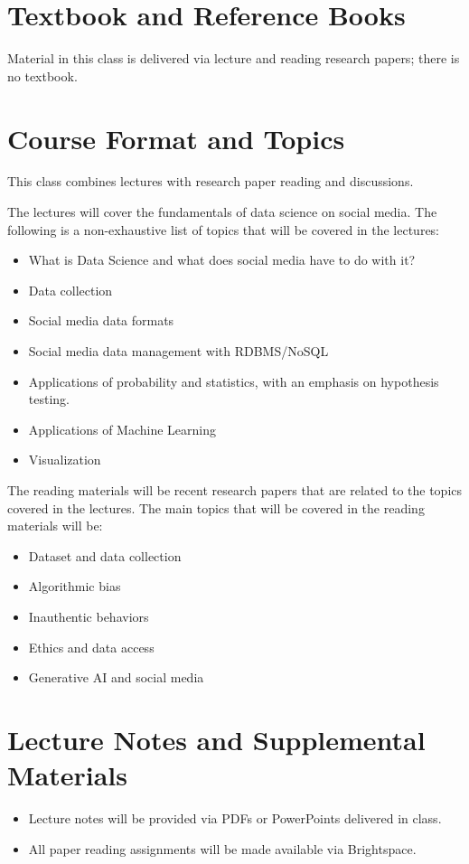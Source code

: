 \documentclass[11pt,article,oneside]{memoir} %
\begin{document}

\section{Textbook and Reference Books}

Material in this class is delivered via lecture and reading research papers; there is no
textbook.

\section{Course Format and Topics}

This class combines lectures with research paper reading and discussions.

The lectures will cover the fundamentals of data science on social media.
The following is a non-exhaustive list of topics that will be covered in the lectures:

\begin{itemize}
    \item What is Data Science and what does social media have to do with it?
    \item Data collection
    \item Social media data formats
    \item Social media data management with RDBMS/NoSQL
    \item Applications of probability and statistics, with an emphasis on hypothesis testing.
    \item Applications of Machine Learning
    \item Visualization
\end{itemize}

The reading materials will be recent research papers that are related to the topics covered in the lectures.
The main topics that will be covered in the reading materials will be:

\begin{itemize}
    \item Dataset and data collection
    \item Algorithmic bias
    \item Inauthentic behaviors
    \item Ethics and data access
    \item Generative AI and social media
\end{itemize}


\section{Lecture Notes and Supplemental Materials}
\begin{itemize}
    \item Lecture notes will be provided via PDFs or PowerPoints delivered in class.
    \item All paper reading assignments will be made available via Brightspace.
\end{itemize}
\end{document}

